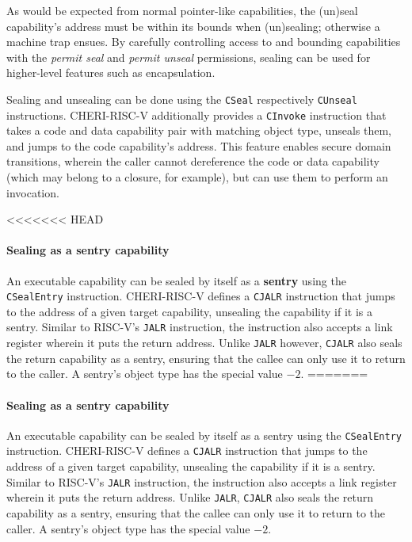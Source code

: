 \documentclass[main.tex]{subfiles}
\begin{document}
As would be expected from normal pointer-like capabilities, the (un)seal capability's address must be within its bounds when (un)sealing; otherwise a machine trap ensues. By carefully controlling access to and bounding capabilities with the \emph{permit seal} and \emph{permit unseal} permissions, sealing can be used for higher-level features such as encapsulation.

Sealing and unsealing can be done using the \texttt{CSeal} respectively \texttt{CUnseal} instructions. CHERI-RISC-V additionally provides a \texttt{CInvoke} instruction that takes a code and data capability pair with matching object type, unseals them, and jumps to the code capability's address. This feature enables secure domain transitions, wherein the caller cannot dereference the code or data capability (which may belong to a closure, for example), but can use them to perform an invocation.

<<<<<<< HEAD
\paragraph{Sealing as a sentry capability} An executable capability can be sealed by itself as a \textbf{\gls{sentry}} using the \texttt{CSealEntry} instruction. CHERI-RISC-V defines a \texttt{CJALR} instruction that jumps to the address of a given target capability, unsealing the capability if it is a \gls{sentry}. Similar to RISC-V's \texttt{JALR} instruction, the instruction also accepts a link register wherein it puts the return address. Unlike \texttt{JALR} however, \texttt{CJALR} also seals the return capability as a \gls{sentry}, ensuring that the callee can only use it to return to the caller. A \gls{sentry}'s object type has the special value $-2$.
=======
\paragraph{Sealing as a sentry capability} An executable capability can be sealed by itself as a \gls{sentry} using the \texttt{CSealEntry} instruction. CHERI-RISC-V defines a \texttt{CJALR} instruction that jumps to the address of a given target capability, unsealing the capability if it is a \gls{sentry}. Similar to RISC-V's \texttt{JALR} instruction, the instruction also accepts a link register wherein it puts the return address. Unlike \texttt{JALR}, \texttt{CJALR} also seals the return capability as a \gls{sentry}, ensuring that the callee can only use it to return to the caller. A \gls{sentry}'s object type has the special value $-2$.
\end{document}
